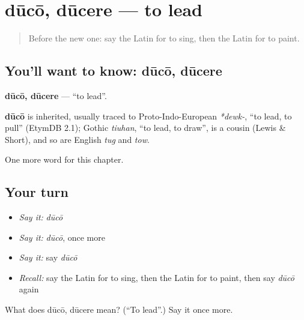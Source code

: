 \section[dūcō, dūcere]{dūcō, dūcere — to lead}

\label{lesson:LA-C154-duco}



\begin{quote}
Before the new one: say the Latin for to sing, then the Latin for to paint.
\end{quote}

\subsection*{You'll want to know: dūcō, dūcere}
\textbf{dūcō, dūcere} — \textquotedblleft{}to lead\textquotedblright{}.

\begin{cousinweb}
\textbf{dūcō} is inherited, usually traced to Proto-Indo-European \emph{*dewk-}, \textquotedblleft{}to lead, to pull\textquotedblright{} (EtymDB 2.1); Gothic \emph{tiuhan}, \textquotedblleft{}to lead, to draw\textquotedblright{}, is a cousin (Lewis \& Short), and so are English \emph{tug} and \emph{tow}.
\end{cousinweb}

\begin{grammarlens}[title={What you've built}]
One more word for this chapter.
\end{grammarlens}

\subsection*{Your turn}
\begin{itemize}
\raggedright
  \item \emph{Say it:} \emph{dūcō}
  \item \emph{Say it:} \emph{dūcō}, once more
  \item \emph{Say it:} say \emph{dūcō}
  \item \emph{Recall:} say the Latin for to sing, then the Latin for to paint, then say \emph{dūcō} again
\end{itemize}

\begin{tcolorbox}[breakable,colback=teal!4,colframe=teal!35!black,title={Before you move on}]
What does dūcō, dūcere mean? (\textquotedblleft{}To lead\textquotedblright{}.) Say it once more.
\end{tcolorbox}
